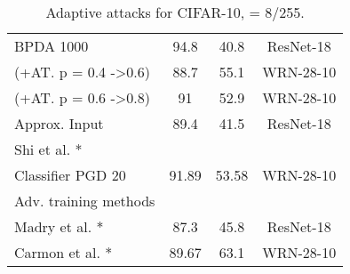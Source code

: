 \begin{table}[th]
\begin{tabular}{lccc}
\qquad BPDA 1000                        & 94.8                        & 40.8                       & ResNet-18             \\
\qquad (+AT. p = 0.4 -\textgreater 0.6)             & 88.7                        & 55.1                       & WRN-28-10             \\
\qquad (+AT. p = 0.6 -\textgreater 0.8) & 91                          & 52.9                       & WRN-28-10             \\
\qquad Approx. Input                    & 89.4                        & 41.5                       & ResNet-18             \\
Shi et al. \cite{shi2020online}*              &                             &                            &                       \\
\qquad Classifier PGD 20                & 91.89                       & 53.58                      & WRN-28-10             \\ \hline
Adv. training methods     &                             &                            &                       \\
Madry et al. \cite{madry2018towards}*            & 87.3                        & 45.8                       & ResNet-18             \\
Carmon et al. \cite{carmon2019unlabeled}*            & 89.67                       & 63.1                       & WRN-28-10             \\ \hline
\end{tabular}
\caption{Adaptive attacks for CIFAR-10,  = {8}/{255}.}\label{adaptive-attacks}
\end{table}
